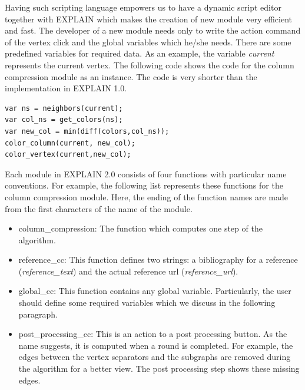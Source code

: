 \documentclass[12pt, twoside,a4paper,toc=bibliography]{scrbook}
\begin{document}
Having such scripting language empowers us to have a dynamic script editor
together with EXPLAIN which makes the creation of new module very efficient and fast.
The developer of a new module needs only to write the action command of the vertex
click and the global variables which he/she needs.
There are some predefined variables for required data.
As an example, the variable \textit{current} represents the current vertex.
The following code shows the code for the column compression
module as an instance. The code is very shorter than the implementation in EXPLAIN 1.0.
\begin{lstlisting}
var ns = neighbors(current);
var col_ns = get_colors(ns);
var new_col = min(diff(colors,col_ns));
color_column(current, new_col);
color_vertex(current,new_col);
\end{lstlisting}
Each module in EXPLAIN 2.0 consists of four functions with particular
name conventions. For example, the following list represents these functions
for the column compression module. Here, the ending of the function names are 
made from the first characters of the name of the module.
\begin{itemize}
\item column\_compression: The function which computes one step of the algorithm.
\item reference\_cc: This function defines two strings: a bibliography for a reference (\textit{reference\_text}) and the actual reference url (\textit{reference\_url}).
\item global\_cc: This function contains any global variable. Particularly, the user should define some required variables which we discuss in the following paragraph.
\item post\_processing\_cc: This is an action to a post processing button. As the name suggests, it is computed
when a round is completed. For example, the edges between the vertex separators and the subgraphs are removed during the algorithm for a better view. The post processing step shows these missing edges.
\end{itemize}
\end{document}
